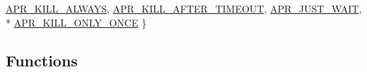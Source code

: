 \begin{DoxyCompactItemize}
\hyperlink{group__apr__thread__proc_gga3eaec78633742e7e0cb9480a21477affaf45d0f72811399b394d1311384e2dfe4}{A\+P\+R\+\_\+\+K\+I\+L\+L\+\_\+\+A\+L\+W\+A\+YS}, 
\hyperlink{group__apr__thread__proc_gga3eaec78633742e7e0cb9480a21477affa16a47aa786b1c1f31ef02353bcae9a1a}{A\+P\+R\+\_\+\+K\+I\+L\+L\+\_\+\+A\+F\+T\+E\+R\+\_\+\+T\+I\+M\+E\+O\+UT}, 
\hyperlink{group__apr__thread__proc_gga3eaec78633742e7e0cb9480a21477affa6ada2605856ac94826edbe824e64e503}{A\+P\+R\+\_\+\+J\+U\+S\+T\+\_\+\+W\+A\+IT}, 
\\*
\hyperlink{group__apr__thread__proc_gga3eaec78633742e7e0cb9480a21477affa24d6f47785093be4cea2a922eeaed098}{A\+P\+R\+\_\+\+K\+I\+L\+L\+\_\+\+O\+N\+L\+Y\+\_\+\+O\+N\+CE}
 \}
\end{DoxyCompactItemize}
\subsection*{Functions}
